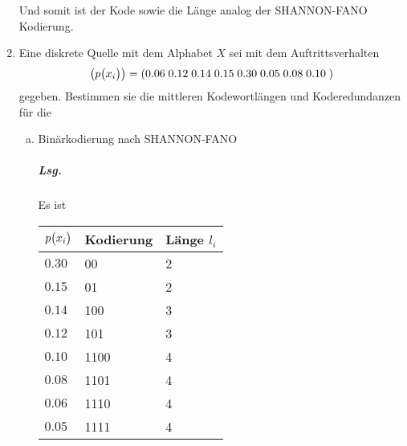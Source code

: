 \documentclass{scrreprt}
\begin{document}
\begin{enumerate}[1.]

  Und somit ist der Kode sowie die Länge analog der SHANNON-FANO Kodierung.

\item Eine diskrete Quelle mit dem Alphabet $X$ sei mit dem Auftrittsverhalten
  \[
    \qty(p\qty\big(x_i)) = \qty(
      0.06 \;
      0.12 \;
      0.14 \;
      0.15 \;
      0.30 \;
      0.05 \;
      0.08 \;
      0.10 \;
    )
  \]
  gegeben.
  Bestimmen sie die mittleren Kodewortlängen und Koderedundanzen für die
  \begin{enumerate}[(a)]
  \item Binärkodierung nach SHANNON-FANO

    \subparagraph{Lsg.} Es ist

    \begin{tabularx}{\textwidth}{|X|X|X|}
      \hline
      $p\qty\big(x_i)$ & Kodierung & Länge $l_i$ \\
      \hline
      $0.30$ & 00   & 2 \\
      $0.15$ & 01   & 2 \\
      $0.14$ & 100  & 3 \\
      $0.12$ & 101  & 3 \\
      $0.10$ & 1100 & 4 \\
      $0.08$ & 1101 & 4 \\
      $0.06$ & 1110 & 4 \\
      $0.05$ & 1111 & 4 \\
      \hline
    \end{tabularx}


\end{enumerate}
\end{enumerate}
\end{document}
